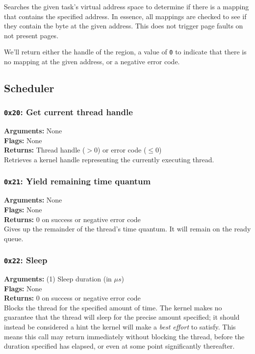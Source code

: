 \documentclass[11pt]{article}
\begin{document}
Searches the given task's virtual address space to determine if there is a mapping that contains the specified address. In essence, all mappings are checked to see if they contain the byte at the given address. This does not trigger page faults on not present pages.

We'll return either the handle of the region, a value of \texttt{0} to indicate that there is no mapping at the given address, or a negative error code.

\newpage
\subsection{Scheduler}
\subsubsection{{\tt 0x20}: Get current thread handle}
\textbf{Arguments:} None \\
\textbf{Flags:} None \\
\textbf{Returns:} Thread handle ($>0$) or error code ($\leq0$) \\

Retrieves a kernel handle representing the currently executing thread.

\subsubsection{{\tt 0x21}: Yield remaining time quantum}
\textbf{Arguments:} None \\
\textbf{Flags:} None \\
\textbf{Returns:} 0 on success or negative error code \\

Gives up the remainder of the thread's time quantum. It will remain on the ready queue.

\subsubsection{{\tt 0x22}: Sleep}
\textbf{Arguments:} (1) Sleep duration (in $\mu s$) \\
\textbf{Flags:} None \\
\textbf{Returns:} 0 on success or negative error code \\

Blocks the thread for the specified amount of time. The kernel makes no guarantee that the thread will sleep for the precise amount specified; it should instead be considered a hint the kernel will make a \textit{best effort} to satisfy. This means this call may return immediately without blocking the thread, before the duration specified has elapsed, or even at some point significantly thereafter.
\end{document}
